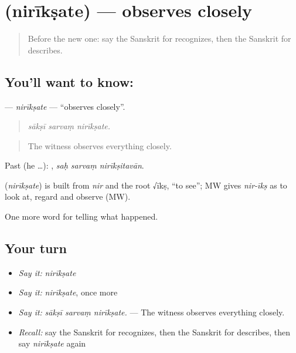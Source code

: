 \section[\texorpdfstring{\sk{निरीक्षते} (nirīkṣate)}{निरीक्षते (nirīkṣate)}]{ (nirīkṣate) — observes closely}

\label{lesson:SA-C289-niriksate}



\begin{quote}
Before the new one: say the Sanskrit for recognizes, then the Sanskrit for describes.
\end{quote}

\subsection*{You'll want to know: }
\textbf{} — \emph{nirīkṣate} — \textquotedblleft{}observes closely\textquotedblright{}.

\begin{quote}
  
\end{quote}

\begin{quote}
\emph{sākṣī sarvaṃ nirīkṣate.}
\end{quote}

\begin{quote}
The witness observes everything closely.
\end{quote}

Past (he …):   , \emph{saḥ sarvaṃ nirīkṣitavān}.

\begin{cousinweb}
\textbf{} (\emph{nirīkṣate}) is built from \emph{nir} and the root √īkṣ, \textquotedblleft{}to see\textquotedblright{}; MW gives \emph{nir-īkṣ} as to look at, regard and observe (MW).
\end{cousinweb}

\begin{grammarlens}[title={What you've built}]
One more word for telling what happened.
\end{grammarlens}

\subsection*{Your turn}
\begin{itemize}
\raggedright
  \item \emph{Say it:} \emph{nirīkṣate}
  \item \emph{Say it:} \emph{nirīkṣate}, once more
  \item \emph{Say it:} \emph{sākṣī sarvaṃ nirīkṣate.} — The witness observes everything closely.
  \item \emph{Recall:} say the Sanskrit for recognizes, then the Sanskrit for describes, then say \emph{nirīkṣate} again
\end{itemize}


